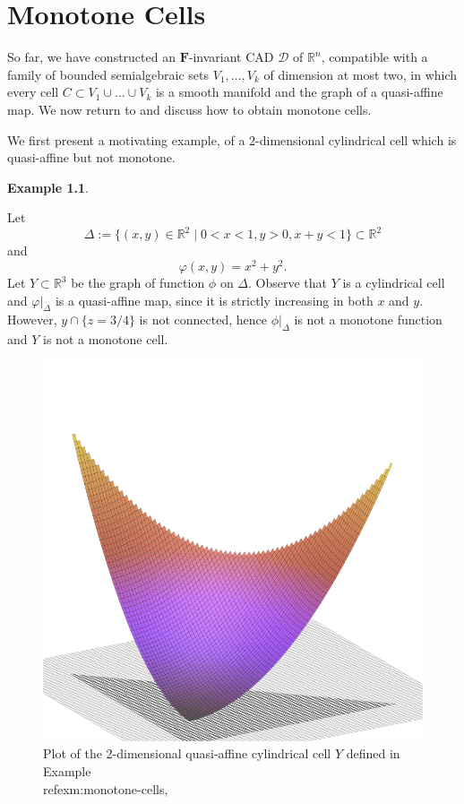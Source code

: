 \documentclass[
]{book}
\theoremstyle{definition}
\theoremstyle{definition}
\newtheorem{example}{Example}[chapter]
\theoremstyle{definition}
\theoremstyle{definition}
\theoremstyle{remark}
\begin{document}
\hypertarget{sec:monotone-cells}{%
\chapter{Monotone Cells}\label{sec:monotone-cells}}

So far, we have constructed an \(\mathbf{F}\)-invariant CAD \(\mathcal{D}\) of \(\mathbb{R}^n\), compatible with a family of bounded semialgebraic sets \(V_1,\ldots,V_k\) of dimension at most two, in which every cell \(C\subset V_1\cup \ldots\cup V_k\) is a smooth manifold and the graph of a quasi-affine map.
We now return to \citep[ Theorem 3.20]{bgv15} and discuss how to obtain monotone cells.

We first present a motivating example, of a 2-dimensional cylindrical cell which is quasi-affine but not monotone.

\begin{example}
\protect\hypertarget{exm:monotone-cells}{}\label{exm:monotone-cells}\citep[Example 3.2]{bgv15}

Let
\[
\Delta := \{ (x,y) \in \mathbb{R}^2 \mid 0 < x < 1, y > 0, x + y < 1 \} \subset \mathbb{R}^2
\] and
\[
\varphi(x,y) = x^2 + y^2.
\]
Let \(Y \subset \mathbb{R}^3\) be the graph of function \(\phi\) on \(\Delta\). Observe that \(Y\) is a cylindrical cell and \(\varphi\vert_\Delta\) is a quasi-affine map, since it is strictly increasing in both \(x\) and \(y\).
However, \(y \cap \{ z = 3/4 \}\) is not connected, hence \(\phi\vert_\Delta\) is not a monotone function and \(Y\) is not a monotone cell.
\end{example}

\begin{figure}

{\centering \includegraphics[width=0.6\linewidth]{gnuplot/qanm-surf} 

}

\caption{Plot of the 2-dimensional quasi-affine cylindrical cell $Y$ defined in Example \\ref{exm:monotone-cells},}\label{fig:unnamed-chunk-1}
\end{figure}
\end{document}

